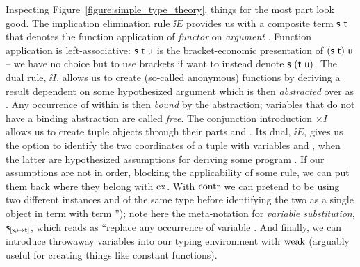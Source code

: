 Inspecting Figure~\ref{figure:simple_type_theory}, things for the most part look good.
The implication elimination rule $\ii E$ provides us with a composite term $\mathsf{s~t}$ that denotes the function application of \textit{functor}  on \textit{argument} .
Function application is left-associative: $\mathsf{s~t~u}$ is the bracket-economic presentation of $(\mathsf{s~t})~\mathsf{u}$ -- we have no choice but to use brackets if want to instead denote $\mathsf{s}~(\mathsf{t~u})$.
The dual rule, $\ii I$, allows us to create (so-called anonymous) functions by deriving a result  dependent on some hypothesized argument  which is then \textit{abstracted} over as .
Any occurrence of  within  is then \textit{bound} by the abstraction; variables that do not have a binding abstraction are called \textit{free}.
The conjunction introduction $\times I$ allows us to create tuple objects  through their parts  and .
Its dual, $\ii E$, gives us the option to identify the two coordinates of a tuple  with variables  and , when the latter are hypothesized assumptions for deriving some program .
If our assumptions are not in order, blocking the applicability of some rule, we can put them back where they belong with $\mathrm{ex}{}$.
With $\mathrm{contr}{}$ we can pretend to be using two different instances  and  of the same type before identifying the two as a single object  in term  with term '');
note here the meta-notation for \textit{variable substitution}, $\mathsf{s}_{[\mathsf{x_i } \mapsto \mathsf{t}]}$, which reads as ``replace any occurrence of variable .
And finally, we can introduce throwaway variables into our typing environment with $\mathrm{weak}{}$ (arguably useful for creating things like constant functions).

